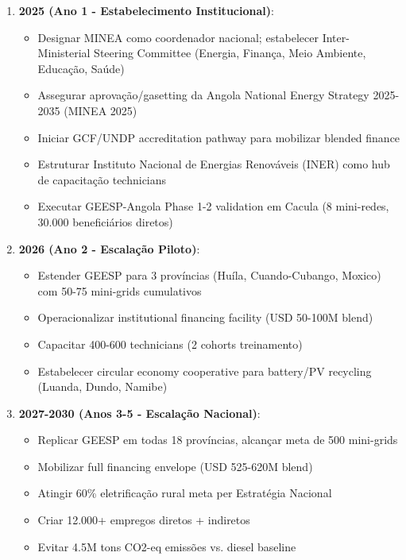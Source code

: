 \documentclass[12pt, a4paper]{article}
\begin{document}
\begin{enumerate}
\item\textbf{2025 (Ano 1 - Estabelecimento Institucional)}:
  \begin{itemize}
    \item Designar MINEA como coordenador nacional; estabelecer Inter-Ministerial Steering Committee (Energia, Finança, Meio Ambiente, Educação, Saúde)
    \item Assegurar aprovação/gasetting da Angola National Energy Strategy 2025-2035 (MINEA 2025)
    \item Iniciar GCF/UNDP accreditation pathway para mobilizar blended finance
    \item Estruturar Instituto Nacional de Energias Renováveis (INER) como hub de capacitação technicians
    \item Executar GEESP-Angola Phase 1-2 validation em Cacula (8 mini-redes, 30.000 beneficiários diretos)
  \end{itemize}

\item\textbf{2026 (Ano 2 - Escalação Piloto)}:
  \begin{itemize}
    \item Estender GEESP para 3 províncias (Huíla, Cuando-Cubango, Moxico) com 50-75 mini-grids cumulativos
    \item Operacionalizar institutional financing facility (USD 50-100M blend)
    \item Capacitar 400-600 technicians (2 cohorts treinamento)
    \item Estabelecer circular economy cooperative para battery/PV recycling (Luanda, Dundo, Namibe)
  \end{itemize}

\item\textbf{2027-2030 (Anos 3-5 - Escalação Nacional)}:
  \begin{itemize}
    \item Replicar GEESP em todas 18 províncias, alcançar meta de 500 mini-grids
    \item Mobilizar full financing envelope (USD 525-620M blend)
    \item Atingir 60\% eletrificação rural meta per Estratégia Nacional
    \item Criar 12.000+ empregos diretos + indiretos
    \item Evitar 4.5M tons CO2-eq emissões vs. diesel baseline
  \end{itemize}
\end{enumerate}
\end{document}
